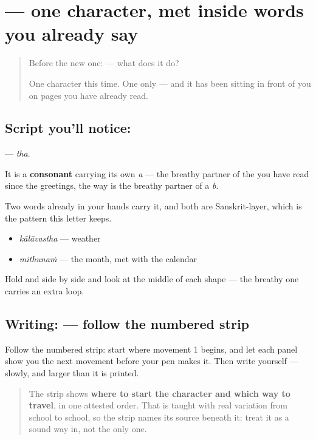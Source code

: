 \section[\texorpdfstring{\ml{ഥ} (tha)}{ഥ (tha)}]{ — one character, met inside words you already say}

\label{lesson:ML-S130-letter-tha}



\begin{quote}
Before the new one:  — what does it do?

One character this time. One only — and it has been sitting in front of you on pages you have already read.
\end{quote}

\subsection*{Script you'll notice: }
\textbf{} — \emph{tha}.

It is a \textbf{consonant} carrying its own \emph{a} — the breathy partner of the \textbf{} you have read since the greetings, the way \textbf{} is the breathy partner of a \emph{b}.

Two words already in your hands carry it, and both are Sanskrit-layer, which is the pattern this letter keeps.

\begin{itemize}
\raggedright
  \item \textbf{} \emph{kālāvastha} — weather
  \item \textbf{} \emph{mithunaṁ} — the month, met with the calendar
\end{itemize}

Hold \textbf{} and \textbf{} side by side and look at the middle of each shape — the breathy one carries an extra loop.

\subsection*{Writing:  — follow the numbered strip}

Follow the numbered strip: start where movement 1 begins, and let each panel show you the next movement before your pen makes it. Then write  yourself — slowly, and larger than it is printed.

\begin{quote}
The strip shows \textbf{where to start the character and which way to travel}, in one attested order. That is taught with real variation from school to school, so the strip names its source beneath it: treat it as a sound way in, not the only one.
\end{quote}

